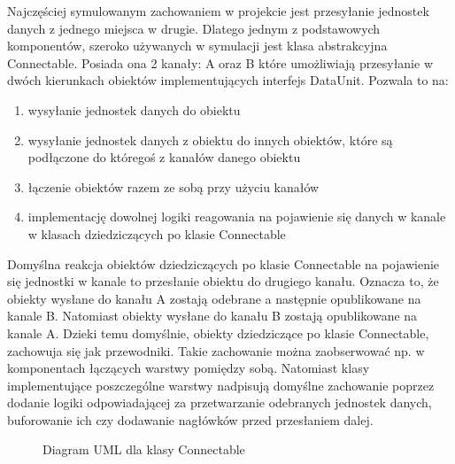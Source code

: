 Najczęściej symulowanym zachowaniem w projekcie jest przesyłanie jednostek danych z jednego miejsca w drugie. Dlatego jednym z podstawowych komponentów, szeroko używanych w symulacji jest klasa abstrakcyjna Connectable. Posiada ona 2 kanały: A oraz B które umożliwiają przesyłanie w dwóch kierunkach obiektów implementujących interfejs DataUnit. Pozwala to na:

\begin{enumerate}
	\item wysyłanie jednostek danych do obiektu
	\item wysyłanie jednostek danych z obiektu do innych obiektów, które są podłączone do któregoś z kanałów danego obiektu
	\item łączenie obiektów razem ze sobą przy użyciu kanałów
	\item implementację dowolnej logiki reagowania na pojawienie się danych w kanale w klasach dziedziczących po klasie Connectable
\end{enumerate}

Domyślna reakcja obiektów dziedziczących po klasie Connectable na pojawienie się jednostki w kanale to przesłanie obiektu do drugiego kanału. Oznacza to, że obiekty wysłane do kanału A zostają odebrane a następnie opublikowane na kanale B. Natomiast obiekty wysłane do kanału B zostają opublikowane na kanale A. Dzieki temu domyślnie, obiekty dziedziczące po klasie Connectable, zachowuja się jak przewodniki. Takie zachowanie można zaobserwować np. w komponentach łączących warstwy pomiędzy sobą. Natomiast klasy implementujące poszczególne warstwy nadpisują domyślne zachowanie poprzez dodanie logiki odpowiadającej za przetwarzanie odebranych jednostek danych, buforowanie ich czy dodawanie nagłówków przed przesłaniem dalej.

\begin{figure}[ht]
	\centerline{}
	\caption{Diagram UML dla klasy Connectable}
	\label{fig:connectable_class}
\end{figure}

